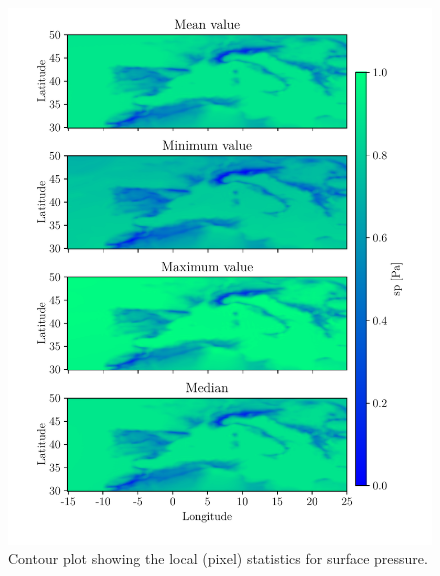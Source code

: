 \begin{figure}[ht]
    \centering
    \includegraphics{python_figs/all_stat_variable_sp.pdf}
    \caption{Contour plot showing the local (pixel) statistics for surface pressure.}
    \label{fig:all_stats_sp}
\end{figure}
